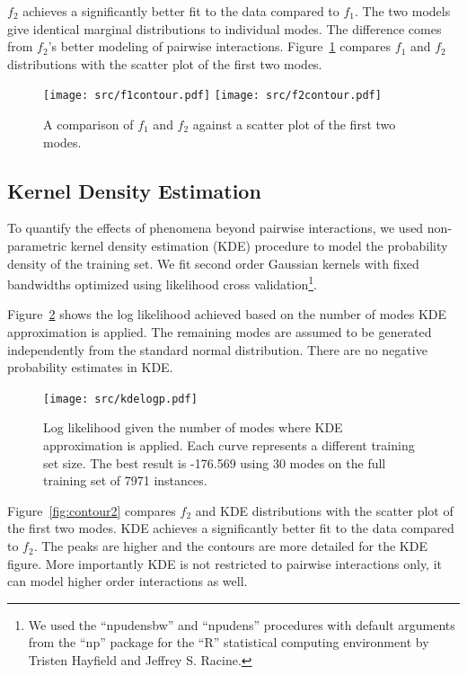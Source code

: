 \documentclass{article}
\begin{document}
$f_2$ achieves a significantly better fit to the data compared to
$f_1$.  The two models give identical marginal distributions to
individual modes.  The difference comes from $f_2$'s better modeling
of pairwise interactions.  Figure~\ref{fig:contour} compares $f_1$ and
$f_2$ distributions with the scatter plot of the first two modes.

\begin{figure}[h]
  \texttt{[image: src/f1contour.pdf]}
  \texttt{[image: src/f2contour.pdf]}
\caption{A comparison of $f_1$ and $f_2$ against a scatter plot of the
  first two modes.}
\label{fig:contour}
\end{figure}

\subsection{Kernel Density Estimation}


To quantify the effects of phenomena beyond pairwise interactions, we
used non-parametric kernel density estimation (KDE) procedure to model
the probability density of the training set.  We fit second order
Gaussian kernels with fixed bandwidths optimized using likelihood
cross validation\footnote{We used the ``npudensbw'' and ``npudens''
  procedures with default arguments from the ``np'' package for the
  ``R'' statistical computing environment by Tristen Hayfield and
  Jeffrey S. Racine.}.

Figure~\ref{fig:kde} shows the log likelihood achieved based on the
number of modes KDE approximation is applied.  The remaining modes are
assumed to be generated independently from the standard normal
distribution.  There are no negative probability estimates in KDE.

\begin{figure}[h]\centering
  \texttt{[image: src/kdelogp.pdf]}
\caption{Log likelihood given the number of modes where KDE
  approximation is applied.  Each curve represents a different
  training set size.  The best result is -176.569 using 30 modes on
  the full training set of 7971 instances.}
\label{fig:kde}
\end{figure}

Figure~\ref{fig:contour2} compares $f_2$ and KDE distributions with
the scatter plot of the first two modes.  KDE achieves a
significantly better fit to the data compared to $f_2$.  The peaks are
higher and the contours are more detailed for the KDE figure.  More
importantly KDE is not restricted to pairwise interactions only, it
can model higher order interactions as well.
\end{document}
